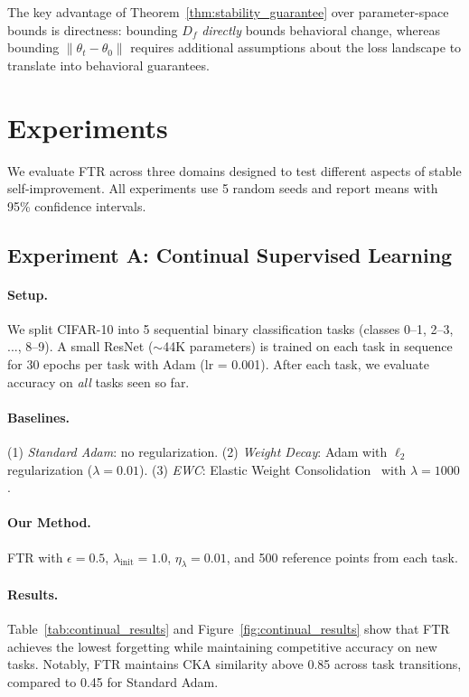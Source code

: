 \documentclass{article}
\newcommand{\norm}[1]{\left\|#1\right\|}
\newcommand{\Df}{D_f}
\begin{document}
The key advantage of Theorem~\ref{thm:stability_guarantee} over parameter-space bounds is directness: bounding $\Df$ \emph{directly} bounds behavioral change, whereas bounding $\norm{\theta_t - \theta_0}$ requires additional assumptions about the loss landscape to translate into behavioral guarantees.


\section{Experiments}

We evaluate FTR across three domains designed to test different aspects of stable self-improvement. All experiments use 5 random seeds and report means with 95\% confidence intervals.

\subsection{Experiment A: Continual Supervised Learning}

\paragraph{Setup.} We split CIFAR-10 into 5 sequential binary classification tasks (classes 0--1, 2--3, ..., 8--9). A small ResNet ($\sim$44K parameters) is trained on each task in sequence for 30 epochs per task with Adam (lr = 0.001). After each task, we evaluate accuracy on \emph{all} tasks seen so far.

\paragraph{Baselines.} (1) \textit{Standard Adam}: no regularization. (2) \textit{Weight Decay}: Adam with $\ell_2$ regularization ($\lambda = 0.01$). (3) \textit{EWC}: Elastic Weight Consolidation~\citep{kirkpatrick2017overcoming} with $\lambda = 1000$.

\paragraph{Our Method.} FTR with $\epsilon = 0.5$, $\lambda_{\text{init}} = 1.0$, $\eta_\lambda = 0.01$, and 500 reference points from each task.

\paragraph{Results.} Table~\ref{tab:continual_results} and Figure~\ref{fig:continual_results} show that FTR achieves the lowest forgetting while maintaining competitive accuracy on new tasks. Notably, FTR maintains CKA similarity above 0.85 across task transitions, compared to 0.45 for Standard Adam.
\end{document}
